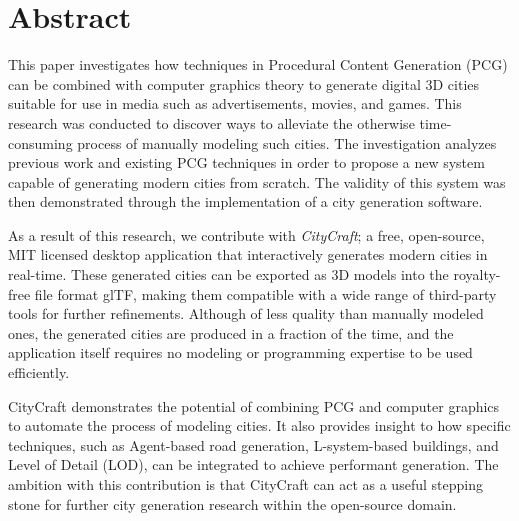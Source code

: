 \chapter*{Abstract}

This paper investigates how techniques in Procedural Content Generation (PCG) can be combined with computer graphics theory to generate digital 3D cities suitable for use in media such as advertisements, movies, and games.
This research was conducted to discover ways to alleviate the otherwise time-consuming process of manually modeling such cities.
The investigation analyzes previous work and existing PCG techniques in order to propose a new system capable of generating modern cities from scratch. 
The validity of this system was then demonstrated through the implementation of a city generation software.

As a result of this research, we contribute with \textit{CityCraft}; a free, open-source, MIT licensed desktop application that interactively generates modern cities in real-time.
These generated cities can be exported as 3D models into the royalty-free file format glTF, making them compatible with a wide range of third-party tools for further refinements.
Although of less quality than manually modeled ones, the generated cities are produced in a fraction of the time, and the application itself requires no modeling or programming expertise to be used efficiently.

CityCraft demonstrates the potential of combining PCG and computer graphics to automate the process of modeling cities.
It also provides insight to how specific techniques, such as Agent-based road generation, L-system-based buildings, and Level of Detail (LOD), can be integrated to achieve performant generation.
The ambition with this contribution is that CityCraft can act as a useful stepping stone for further city generation research within the open-source domain.